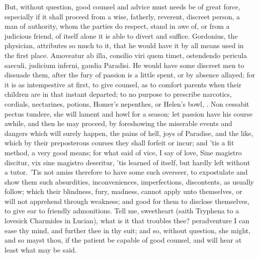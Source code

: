 But, without question, good counsel and advice must needs be of great force,
especially if it shall proceed from a wise, fatherly, reverent, discreet
person, a man of authority, whom the parties do respect, stand in awe of, or
from a judicious friend, of itself alone it is able to divert and suffice.
Gordonius, the physician, attributes so much to it, that he would have it by
all means used in the first place. Amoveatur ab illa, consilio viri quem timet,
ostendendo pericula saeculi, judicium inferni, gaudia Paradisi. He would have
some discreet men to dissuade them, after the fury of passion is a little
spent, or by absence allayed; for it is as intempestive at first, to give
counsel, as to comfort parents when their children are in that instant
departed; to no purpose to prescribe narcotics, cordials, nectarines, potions,
Homer's nepenthes, or Helen's bowl, \etc{}. Non cessabit pectus tundere, she
will lament and howl for a season: let passion have his course awhile, and then
he may proceed, by foreshowing the miserable events and dangers which will
surely happen, the pains of hell, joys of Paradise, and the like, which by
their preposterous courses they shall forfeit or incur; and 'tis a fit
method, a very good means; for what \Seneca{} said of vice, I say of
love, Sine magistro discitur, vix sine magistro deseritur, 'tis learned
of itself, but hardly left without a tutor. 'Tis not amiss
therefore to have some such overseer, to expostulate and show them such
absurdities, inconveniences, imperfections, discontents, as usually
follow; which their blindness, fury, madness, cannot apply unto
themselves, or will not apprehend through weakness; and good for them
to disclose themselves, to give ear to friendly admonitions. Tell me,
sweetheart (saith Tryphena to a lovesick Charmides in Lucian),
what is it that troubles thee? peradventure I can ease thy mind, and
further thee in thy suit; and so, without question, she might, and so
mayst thou, if the patient be capable of good counsel, and will hear at
least what may be said.

